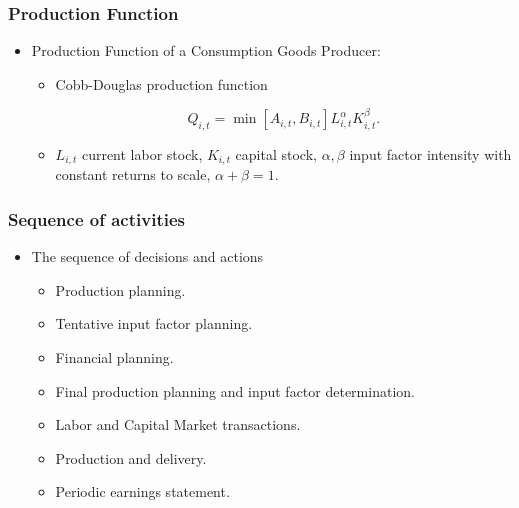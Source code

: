 \documentclass{beamer}
\begin{document}




\frame
{
  \frametitle{Production Function} 
\begin{itemize}
	\item Production Function of a Consumption Goods Producer:
	
	
\begin{itemize}
	
	\item Cobb-Douglas production function
	
	\[ Q_{i,t}=  \min \left[A_{i,t},B_{i,t}\right] L_{i,t}^{\alpha}K_{i,t}^{\beta}.\]
	
	\item $ L_{i,t}$ current labor stock, $ K_{i,t}$ capital stock, $\alpha, \beta$ input factor intensity with constant returns to scale, $\alpha + \beta =1$.

\end{itemize}

	\end{itemize}


}


\frame
{
  \frametitle{Sequence of activities} 


\begin{itemize}
	\item The sequence of decisions and actions
	\begin{itemize}
	\item Production planning.
	\item Tentative input factor planning.
	\item Financial planning.
	\item Final production planning and input factor determination.
	\item Labor and Capital Market transactions.
	\item Production and delivery.
	\item Periodic earnings statement.
	 
	\end{itemize}
	
	\end{itemize}


}
\end{document}
